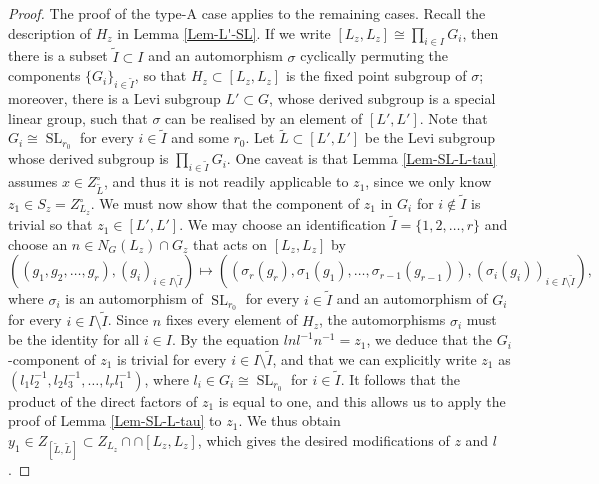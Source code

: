 \documentclass[11pt,oneside,dvipsnames]{amsart}
\theoremstyle{plain}
\theoremstyle{definition}
\theoremstyle{named}
\DeclareMathOperator{\SL}{SL}
\begin{document}
\begin{proof}
The proof of the type-A case applies to the remaining cases. Recall the description of $H_z$ in Lemma \ref{Lem-L'-SL}. If we write $[L_z,L_z]\cong \prod_{i\in I}G_i$, then there is a subset $\tilde{I}\subset I$ and an automorphism $\sigma$ cyclically permuting the components $\{G_i\}_{i\in\tilde{I}}$, so that $H_z\subset[L_z,L_z]$ is the fixed point subgroup of $\sigma$; moreover, there is a Levi subgroup $L'\subset G$, whose derived subgroup is a special linear group, such that $\sigma$ can be realised by an element of $[L',L']$. Note that $G_i\cong\SL_{r_0}$ for every $i\in\tilde{I}$ and some $r_0$. Let $\tilde{L}\subset[L',L']$ be the Levi subgroup whose derived subgroup is $\prod_{i\in\tilde{I}}G_i$. One caveat is that Lemma \ref{Lem-SL-L-tau} assumes $x\in Z_{\tilde{L}}^{\circ}$, and thus it is not readily applicable to $z_1$, since we only know $z_1\in S_z=Z_{L_z}^{\circ}$. We must now show that the component of $z_1$ in $G_i$ for $i\notin \tilde{I}$ is trivial so that $z_1\in[L',L']$. We may choose an identification $\tilde{I}=\{1,2,\ldots,r\}$ and choose an $n\in N_G(L_z)\cap G_z$ that acts on $[L_z,L_z]$ by
$$
((g_1,g_2,\ldots,g_r),(g_i)_{i\in I\setminus\tilde{I}})\longmapsto((\sigma_r(g_r),\sigma_1(g_1),\ldots,\sigma_{r-1}(g_{r-1})),(\sigma_i(g_i))_{i\in I\setminus\tilde{I}}),
$$ 
where $\sigma_i$ is an automorphism of $\SL_{r_0}$ for every $i\in\tilde{I}$ and an automorphism of $G_i$ for every $i\in I\setminus\tilde{I}$. Since $n$ fixes every element of $H_z$, the automorphisms $\sigma_i$ must be the identity for all $i\in I$. By the equation $lnl^{-1}n^{-1}=z_1$, we deduce that the $G_i$-component of $z_1$ is trivial for every $i\in I\setminus\tilde{I}$, and that we can explicitly write $z_1$ as $(l_1l_2^{-1},l_2l_3^{-1},\ldots,l_rl_1^{-1})$, where $l_i\in G_i\cong\SL_{r_0}$ for $i\in\tilde{I}$. It follows that the product of the direct factors of $z_1$ is equal to one, and this allows us to apply the proof of Lemma \ref{Lem-SL-L-tau} to $z_1$. We thus obtain $y_1\in Z_{[\tilde{L},\tilde{L}]}\subset Z_{L_z}\cap \cap [L_z,L_z]$, which gives the desired modifications of $z$ and $l$.
\end{proof}
\end{document}
